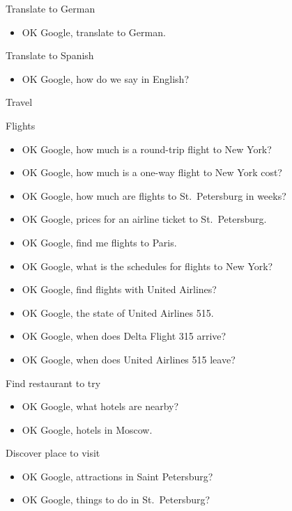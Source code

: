 \documentclass[
  a4paper,
]{article}
\providecommand{\tightlist}{%
  \setlength{\itemsep}{0pt}\setlength{\parskip}{0pt}}\usepackage{longtable,booktabs,array}
\begin{document}
Translate to German

\begin{itemize}
\tightlist
\item
  OK Google, translate to German.
\end{itemize}

Translate to Spanish

\begin{itemize}
\tightlist
\item
  OK Google, how do we say in English?
\end{itemize}

Travel

Flights

\begin{itemize}
\item
  OK Google, how much is a round-trip flight to New York?
\item
  OK Google, how much is a one-way flight to New York cost?
\item
  OK Google, how much are flights to St.~Petersburg in weeks?
\item
  OK Google, prices for an airline ticket to St.~Petersburg.
\item
  OK Google, find me flights to Paris.
\item
  OK Google, what is the schedules for flights to New York?
\item
  OK Google, find flights with United Airlines?
\item
  OK Google, the state of United Airlines 515.
\item
  OK Google, when does Delta Flight 315 arrive?
\item
  OK Google, when does United Airlines 515 leave?
\end{itemize}

Find restaurant to try~~

\begin{itemize}
\item
  OK Google, what hotels are nearby?
\item
  OK Google, hotels in Moscow.~~
\end{itemize}

Discover place to visit

\begin{itemize}
\item
  OK Google, attractions in Saint Petersburg?
\item
  OK Google, things to do in St.~Petersburg?
\end{itemize}
\end{document}
